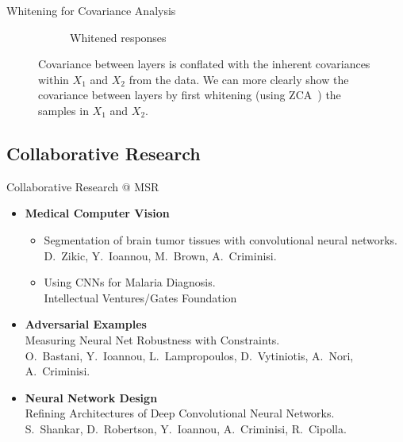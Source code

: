 \documentclass[t,xcolor=dvipsnames]{beamer}
\begin{document}
\begin{frame}{Whitening for Covariance Analysis}
\begin{figure}[tbp]
\begin{subfigure}[b]{0.45\linewidth}
    \caption{Whitened responses}
    \label{fig:whitened}
\end{subfigure}
\caption{Covariance between layers is conflated with the inherent covariances within $X_1$ and $X_2$ from the data. We can more clearly show the covariance between layers by first whitening (using ZCA~\cite{CIFAR10}) the samples in $X_1$ and $X_2$.}
\label{fig:whitevsnot}
\end{figure}
\end{frame}


\subsection{Collaborative Research}
\begin{frame}{Collaborative Research @ MSR}
\begin{itemize}
    \item \textbf{Medical Computer Vision}
    \begin{itemize}
        \item Segmentation of brain tumor tissues with convolutional neural networks.\\{\footnotesize D.\ Zikic, Y.\ Ioannou, M.\ Brown, A.\ Criminisi.}\\%
        \item Using CNNs for Malaria Diagnosis.\\{\footnotesize Intellectual Ventures/Gates Foundation}
    \end{itemize}
    \item \textbf{Adversarial Examples}\\Measuring Neural Net Robustness with Constraints.\\{\footnotesize O.\ Bastani, Y.\ Ioannou, L.\ Lampropoulos, D.\ Vytiniotis, A.\ Nori, A.\ Criminisi.}%
    \item \textbf{Neural Network Design}\\Refining Architectures of Deep Convolutional Neural Networks.\\{\footnotesize 
S.\ Shankar, D.\ Robertson, Y.\ Ioannou, A.\ Criminisi, R.\ Cipolla.}%
\end{itemize}
\end{frame}
\end{document}
